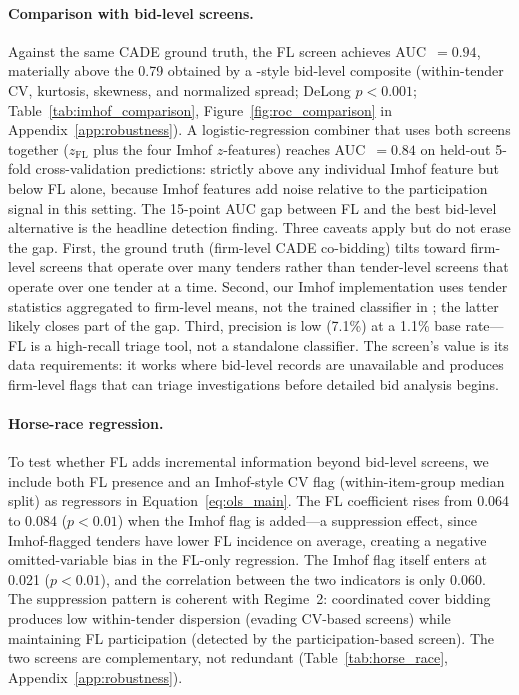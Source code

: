 \paragraph{Comparison with bid-level screens.}
Against the same CADE ground truth, the FL screen achieves
AUC~$= 0.94$, materially above the 0.79 obtained by a
\citet{imhof2019detecting}-style bid-level composite (within-tender
CV, kurtosis, skewness, and normalized spread; DeLong $p < 0.001$;
Table~\ref{tab:imhof_comparison},
Figure~\ref{fig:roc_comparison} in Appendix~\ref{app:robustness}).
A logistic-regression combiner that uses both screens together
($z_{\mathrm{FL}}$ plus the four Imhof $z$-features) reaches
AUC~$= 0.84$ on held-out 5-fold cross-validation predictions:
strictly above any individual Imhof feature but below FL alone,
because Imhof features add noise relative to the participation
signal in this setting. The 15-point AUC gap between FL and the
best bid-level alternative is the headline detection finding.
Three caveats apply but do not erase the gap. First, the ground
truth (firm-level CADE co-bidding) tilts toward firm-level screens
that operate over many tenders rather than tender-level screens
that operate over one tender at a time. Second, our Imhof
implementation uses tender statistics aggregated to firm-level means,
not the trained classifier in \citet{huber2019machine}; the latter
likely closes part of the gap. Third, precision is low (7.1\%) at
a 1.1\% base rate---FL is a high-recall triage tool, not a
standalone classifier. The screen's value is its data
requirements: it works where bid-level records are unavailable
and produces firm-level flags that can triage investigations
before detailed bid analysis begins.

\paragraph{Horse-race regression.}
To test whether FL adds incremental information beyond bid-level
screens, we include both FL presence and an Imhof-style CV flag
(within-item-group median split) as regressors in
Equation~\eqref{eq:ols_main}. The FL coefficient rises from 0.064 to 0.084
($p < 0.01$) when the Imhof flag is added---a suppression effect,
since Imhof-flagged tenders have lower FL incidence on average,
creating a negative omitted-variable bias in the FL-only regression.
The Imhof flag itself enters at 0.021 ($p < 0.01$), and the
correlation between the two indicators is only 0.060. The suppression
pattern is coherent with Regime~2: coordinated cover bidding produces
low within-tender dispersion (evading CV-based screens) while
maintaining FL participation (detected by the participation-based
screen). The two screens are complementary, not redundant
(Table~\ref{tab:horse_race}, Appendix~\ref{app:robustness}).

